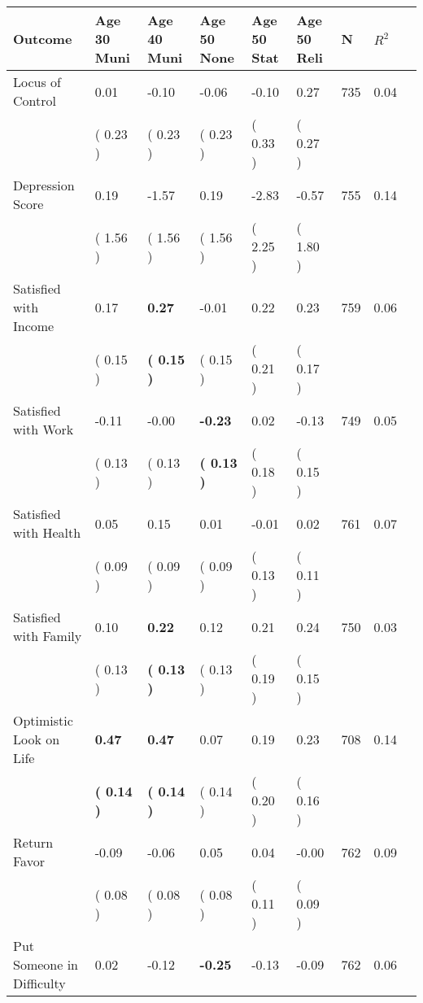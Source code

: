 \begin{tabular}{L{6.2cm} C{1.8cm} C{1.8cm} C{1.8cm} C{1.8cm} C{1.8cm} C{1.8cm} C{0.3cm} C{0.3cm}}
\toprule
 \textbf{Outcome} & \textbf{Age 30 Muni} & \textbf{Age 40 Muni} & \textbf{Age 50 None} & \textbf{Age 50 Stat} & \textbf{Age 50 Reli} & \textbf{N} & \textbf{$ R^2$} \\
\midrule
Locus of Control &      0.01 &     -0.10 &     -0.06 &     -0.10 &      0.27  & 735 &       0.04 \\ 
 & (     0.23 ) & (     0.23 ) & (     0.23 ) & (     0.33 ) & (     0.27 )  & \\
Depression Score &      0.19 &     -1.57 &      0.19 &     -2.83 &     -0.57  & 755 &       0.14 \\ 
 & (     1.56 ) & (     1.56 ) & (     1.56 ) & (     2.25 ) & (     1.80 )  & \\
Satisfied with Income &      0.17 & \textbf{     0.27} &     -0.01 &      0.22 &      0.23  & 759 &       0.06 \\ 
 & (     0.15 ) & \textbf{(     0.15 )} & (     0.15 ) & (     0.21 ) & (     0.17 )  & \\
Satisfied with Work &     -0.11 &     -0.00 & \textbf{    -0.23} &      0.02 &     -0.13  & 749 &       0.05 \\ 
 & (     0.13 ) & (     0.13 ) & \textbf{(     0.13 )} & (     0.18 ) & (     0.15 )  & \\
Satisfied with Health &      0.05 &      0.15 &      0.01 &     -0.01 &      0.02  & 761 &       0.07 \\ 
 & (     0.09 ) & (     0.09 ) & (     0.09 ) & (     0.13 ) & (     0.11 )  & \\
Satisfied with Family &      0.10 & \textbf{     0.22} &      0.12 &      0.21 &      0.24  & 750 &       0.03 \\ 
 & (     0.13 ) & \textbf{(     0.13 )} & (     0.13 ) & (     0.19 ) & (     0.15 )  & \\
Optimistic Look on Life & \textbf{     0.47} & \textbf{     0.47} &      0.07 &      0.19 &      0.23  & 708 &       0.14 \\ 
 & \textbf{(     0.14 )} & \textbf{(     0.14 )} & (     0.14 ) & (     0.20 ) & (     0.16 )  & \\
Return Favor &     -0.09 &     -0.06 &      0.05 &      0.04 &     -0.00  & 762 &       0.09 \\ 
 & (     0.08 ) & (     0.08 ) & (     0.08 ) & (     0.11 ) & (     0.09 )  & \\
Put Someone in Difficulty &      0.02 &     -0.12 & \textbf{    -0.25} &     -0.13 &     -0.09  & 762 &       0.06 \\ 

\end{tabular}
